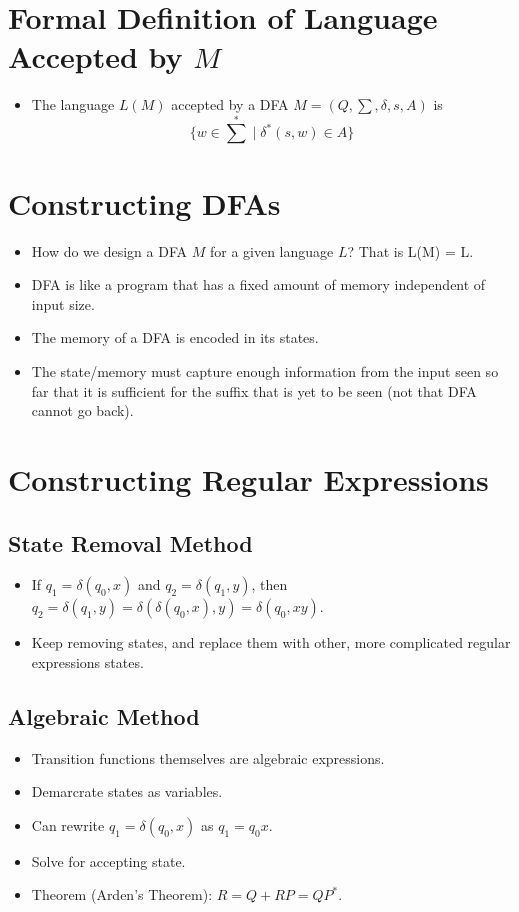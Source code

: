 \documentclass[12pt]{article}
\begin{document}
\section{Formal Definition of Language Accepted by $M$}
\begin{itemize}
    \item The language $L(M)$ accepted by a DFA $M = (Q, \sum, \delta, s, A)$ is
    \begin{equation}
        \textstyle \{ w \in \sum^{\ast} \mid \delta^{\ast}(s, w) \in A \}
    \end{equation}
\end{itemize}

\section{Constructing DFAs}
\begin{itemize}
    \item How do we design a DFA $M$ for a given language $L$? That is L(M) = L.
    \item DFA is like a program that has a fixed amount of memory independent of input size.
    \item The memory of a DFA is encoded in its states.
    \item The state/memory must capture enough information from the input seen so far that it is sufficient for the suffix that is yet to be seen (not that DFA cannot go back).
\end{itemize}

\section{Constructing Regular Expressions}

\subsection{State Removal Method}
\begin{itemize}
    \item If $q_1 = \delta(q_0, x)$ and $q_2 = \delta(q_1, y)$, then $q_2 = \delta(q_1, y) = \delta(\delta(q_0, x), y) = \delta(q_0, xy)$.
    \item Keep removing states, and replace them with other, more complicated regular expressions states.
\end{itemize}

\subsection{Algebraic Method}
\begin{itemize}
    \item Transition functions themselves are algebraic expressions.
    \item Demarcrate states as variables.
    \item Can rewrite $q_1 = \delta(q_0, x)$ as $q_1 = q_0x$.
    \item Solve for accepting state.
    \item Theorem (Arden's Theorem): $R = Q + RP = QP^{\ast}$.
\end{itemize}
\end{document}
